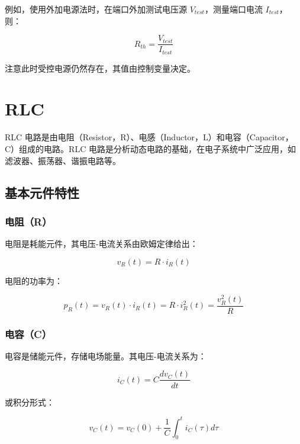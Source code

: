 例如，使用外加电源法时，在端口外加测试电压源 $V_{test}$，测量端口电流 $I_{test}$，则：

\begin{equation}
R_{th} = \frac{V_{test}}{I_{test}}
\end{equation}

注意此时受控电源仍然存在，其值由控制变量决定。

\section{RLC}

RLC 电路是由电阻（Resistor，R）、电感（Inductor，L）和电容（Capacitor，C）组成的电路。RLC 电路是分析动态电路的基础，在电子系统中广泛应用，如滤波器、振荡器、谐振电路等。

\subsection{基本元件特性}

\subsubsection{电阻（R）}

电阻是耗能元件，其电压-电流关系由欧姆定律给出：

\begin{equation}
v_R(t) = R \cdot i_R(t) \label{eq:resistor-v-i}
\end{equation}

电阻的功率为：

\begin{equation}
p_R(t) = v_R(t) \cdot i_R(t) = R \cdot i_R^2(t) = \frac{v_R^2(t)}{R} \label{eq:resistor-power}
\end{equation}

\subsubsection{电容（C）}

电容是储能元件，存储电场能量。其电压-电流关系为：

\begin{equation}
i_C(t) = C \frac{dv_C(t)}{dt} \label{eq:capacitor-i}
\end{equation}

或积分形式：

\begin{equation}
v_C(t) = v_C(0) + \frac{1}{C} \int_0^t i_C(\tau) d\tau \label{eq:capacitor-v}
\end{equation}

